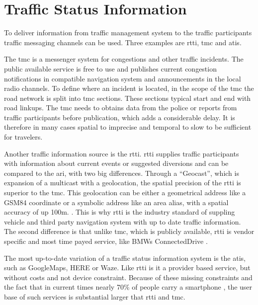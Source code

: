 \documentclass[a4paper,12pt]{report}
\begin{document}
\section{Traffic Status Information}

To deliver information from traffic management system to the traffic participants traffic messaging channels can be used. Three examples are \acrfull{rtti}, \acrfull{tmc} and \acrfull{atis}.

The \acrfull{tmc} is a messenger system for congestions and other traffic incidents. The public available service is free to use and publishes current congestion notifications in compatible navigation system and announcements in the local radio channels. To define where an incident is located, in the scope of the \acrshort{tmc} the road network is split into \acrshort{tmc} sections. These sections typical start and end with road linkups. The \acrshort{tmc} needs to obtains data from the police or reports from traffic participants before publication, which adds a considerable delay. It is therefore in many cases spatial to imprecise and temporal to slow to be sufficient for travelers. \cite{LAPID2020}

Another traffic information source is the \acrfull{rtti}. \acrshort{rtti} supplies traffic participants with information about current events or suggested diversions and can be compared to the \acrfull{ari}, with two big differences. Through a “Geocast”, which is expansion of a multicast with a geolocation, the spatial precision of the \acrshort{rtti} is superior to the \acrshort{tmc}. This geolocation can be either a geometrical address like a GSM84 coordinate or a symbolic address like an area alias, with a spatial accuracy of up 100m.  \cite{LAPID2020,HindenDeering2006,ImielinskiNavas1996}. This is why \acrshort{rtti} is the industry standard of suppling vehicle and third party navigation system with up to date traffic information. The second difference is that unlike \acrshort{tmc}, which is publicly available, \acrshort{rtti} is vendor specific and most time payed service, like BMWs ConnectedDrive \cite{BMW2020}. 


The most up-to-date variation of a traffic status information system is the \acrfull{atis}, such as GoogleMaps, HERE or Waze. Like \acrshort{rtti} is it a provider based service, but without costs and not device constraint. Because of these missing constraints and the fact that in current times nearly 70\% of people carry a smartphone \cite{IZM2020}, the user base of such services is substantial larger that \acrshort{rtti} and \acrshort{tmc}.
\end{document}
